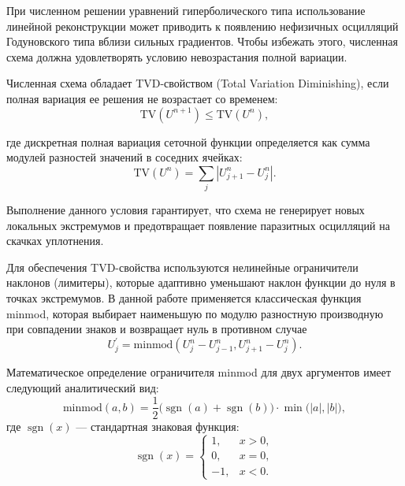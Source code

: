 \documentclass[a4paper,14pt]{extarticle}
\theoremstyle{theorem}
\theoremstyle{lemma}
\begin{document}
При численном решении уравнений гиперболического типа использование линейной реконструкции может приводить к появлению нефизичных осцилляций Годуновского типа вблизи сильных градиентов. Чтобы избежать этого, численная схема должна удовлетворять условию невозрастания полной вариации.

Численная схема обладает TVD-свойством (Total Variation Diminishing), если полная вариация ее решения не возрастает со временем: 
\begin{equation}
\label{eq:tvd_condition}
\mathrm{TV}(U^{n+1}) \leq \mathrm{TV}(U^{n}),
\end{equation}

где дискретная полная вариация сеточной функции определяется как сумма модулей разностей значений в соседних ячейках:
\begin{equation}
\label{eq:tv_def}
\mathrm{TV}(U^n) = \sum_{j} \left| U_{j+1}^n - U_j^n \right|.
\end{equation}

Выполнение данного условия гарантирует, что схема не генерирует новых локальных экстремумов и предотвращает появление паразитных осцилляций на скачках уплотнения.

Для обеспечения TVD-свойства используются нелинейные ограничители наклонов (лимитеры), которые адаптивно уменьшают наклон функции до нуля в точках экстремумов. В данной работе применяется классическая функция \textrm{minmod}, которая выбирает наименьшую по модулю разностную производную при совпадении знаков и возвращает нуль в противном случае
\begin{equation}
\label{eq:slope_limiter}
U_j^\prime = \text{minmod} \left( U_j^n - U_{j-1}^n, U_{j+1}^n - U_j^n \right).
\end{equation}

Математическое определение ограничителя minmod для двух аргументов имеет следующий аналитический вид:
\begin{equation}
\label{eq:minmod_def}
\text{minmod}(a, b) = \frac{1}{2} \big( \operatorname{sgn}(a) + \operatorname{sgn}(b) \big) \cdot \min\big( |a|, |b| \big),
\end{equation}
где $\operatorname{sgn}(x)$ — стандартная знаковая функция:
\begin{equation}
\label{eq:sgn_def}
\operatorname{sgn}(x) =
\begin{cases} 
    1, & x > 0, \\
    0, & x = 0, \\
    -1, & x < 0.
\end{cases}
\end{equation}
\end{document}
